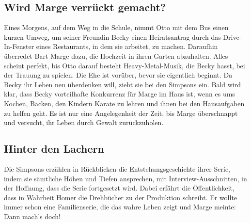 \subsection{Wird Marge verrückt gemacht?}\label{BABF18}
Eines Morgens, auf dem Weg in die Schule, nimmt Otto mit dem Bus einen kurzen Umweg, um seiner Freundin Becky einen Heiratsantrag durch das Drive-In-Fenster eines Restaurants, in dem sie arbeitet, zu machen. Daraufhin überredet Bart Marge dazu, die Hochzeit in ihren Garten abzuhalten. Alles scheint perfekt, bis Otto darauf besteht Heavy-Metal-Musik, die Becky hasst, bei der Trauung zu spielen. Die Ehe ist vorüber, bevor sie eigentlich beginnt. Da Becky ihr Leben neu überdenken will, zieht sie bei den Simpsons ein. Bald wird klar, dass Becky vorteilhafte Konkurrenz für Marge im Haus ist, wenn es ums Kochen, Backen, den Kindern Karate zu lehren und ihnen bei den Hausaufgaben zu helfen geht. Es ist nur eine Angelegenheit der Zeit, bis Marge überschnappt und versucht, ihr Leben durch Gewalt zurückzuholen.


	
\subsection{Hinter den Lachern}\label{BABF19}
Die Simpsons erzählen in Rückblicken die Entstehungsgeschichte ihrer Serie, indem sie sämtliche Höhen und Tiefen ansprechen, mit Interview-Ausschnitten, in der Hoffnung, dass die Serie fortgesetzt wird. Dabei erfährt die Öffentlichkeit, dass in Wahrheit Homer die Drehbücher zu der Produktion schreibt. Er wollte immer schon eine Familienserie, die das wahre Leben zeigt und Marge meinte: \glqq Dann mach's doch!\grqq

